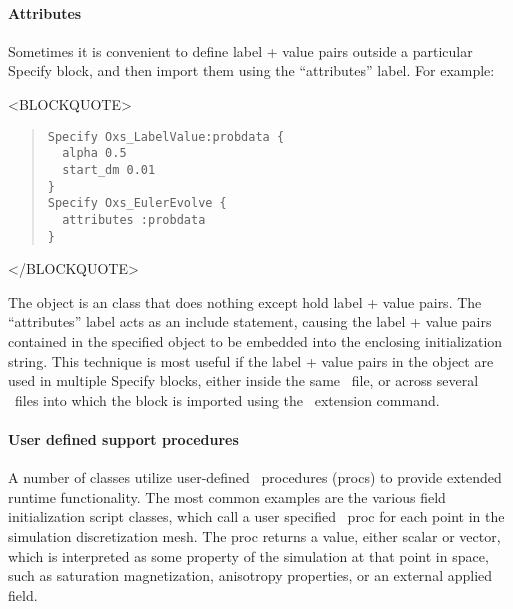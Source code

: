 \paragraph{Attributes}%
\label{par:specifyAttributes}
Sometimes it is convenient to define label + value pairs outside a
particular Specify block, and then import them using the
``attributes'' label.  For example:
\begin{rawhtml}<BLOCKQUOTE>\end{rawhtml}
\begin{quote}
\begin{verbatim}
Specify Oxs_LabelValue:probdata {
  alpha 0.5
  start_dm 0.01
}
Specify Oxs_EulerEvolve {
  attributes :probdata
}
\end{verbatim}
\end{quote}
\begin{rawhtml}</BLOCKQUOTE>\end{rawhtml}
The  object is an  class that does
nothing except hold label + value pairs.  The ``attributes'' label acts as an
include statement, causing the label + value pairs contained in the
specified  object to be embedded into the enclosing
 initialization string.  This technique is most useful if the
label + value pairs in the  object are used in
multiple Specify blocks, either inside the same \MIF\ file, or
across several \MIF\ files into which the  block is
imported using the  \MIF\ extension command.

\paragraph{User defined support procedures}%
\label{par:supportProcs}
A number of  classes utilize user-defined \Tcl\
procedures (procs) to provide extended runtime functionality.  The
most common examples are the various field initialization script
classes, which call a user specified \Tcl\ proc for each point in the
simulation discretization mesh.  The proc returns a value, either
scalar or vector, which is interpreted as some property of the
simulation at that point in space, such as saturation magnetization,
anisotropy properties, or an external applied field.

